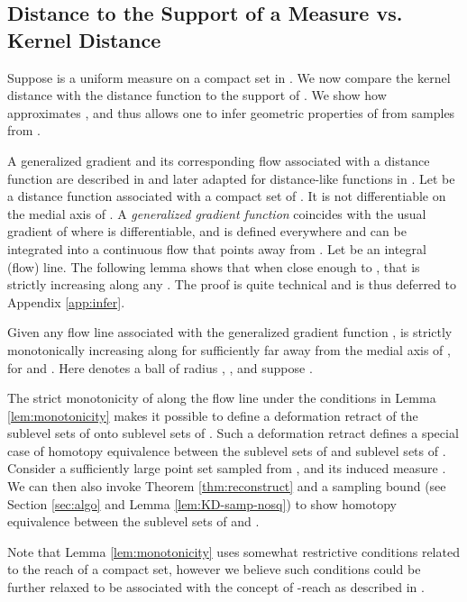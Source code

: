 \documentclass[11pt]{myclass}
\begin{document}
\subsection{Distance to the Support of a Measure vs. Kernel Distance}
\label{sec:infer}
Suppose  is a uniform measure on a compact set  in . 
We now compare the kernel distance  with the distance function  to the support  of . We show how  approximates , and thus allows one to infer geometric properties of  from samples from . 

A generalized gradient and its corresponding flow associated with a distance function are described in \cite{ChazalCohen-SteinerLieutier2009} and later adapted for distance-like functions in \cite{ChazalCohen-SteinerMerigot2011}. 
Let  be a distance function associated with a compact set  of . 
It is not differentiable on the medial axis of . 
A \emph{generalized gradient function}  coincides with the usual gradient of  where  is differentiable, and is defined everywhere and can be integrated into a continuous flow  that points away from .   
Let  be an integral (flow) line.  
The following lemma shows that when close enough to , that  is strictly increasing along any .  The proof is quite technical and is thus deferred to Appendix \ref{app:infer}.  

\begin{lemma}
Given any flow line  associated with the generalized gradient function ,  is strictly monotonically increasing along  for  sufficiently far away from the medial axis of , for  and . 
Here  denotes a ball of radius ,  ,  and suppose .  
\label{lem:monotonicity}
\end{lemma}

The strict monotonicity of  along the flow line under the conditions in Lemma \ref{lem:monotonicity} makes it possible to define a deformation retract of the sublevel sets of  onto sublevel sets of . Such a deformation retract defines a special case of homotopy equivalence between the sublevel sets of  and sublevel sets of . 
Consider a sufficiently large point set  sampled from , and its induced measure .  
We can then also invoke Theorem \ref{thm:reconstruct} and a sampling bound (see Section \ref{sec:algo} and Lemma \ref{lem:KD-samp-nosq}) to show homotopy equivalence between the sublevel sets of  and .  



Note that Lemma \ref{lem:monotonicity} uses somewhat restrictive conditions related to the reach of a compact set, however we believe such conditions could be further relaxed to be associated with the concept of -reach as described in \cite{ChazalCohen-SteinerLieutier2009}. 
\end{document}
